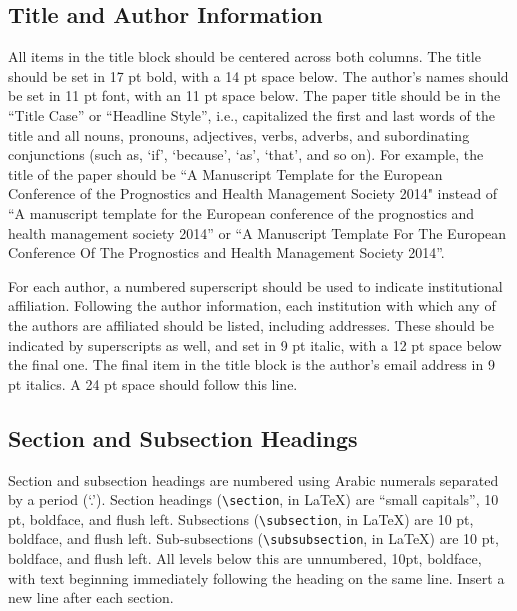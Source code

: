 \documentclass[IJPHM, 2014, 00]{PHMSociety}
\begin{document}
\subsection{Title and Author Information}
All items in the title block should be centered across both columns.  The title should be set in 17 pt bold, with a 14 pt space below.  The author's names should be set in 11 pt font, with an 11 pt space below. The paper title should be in the ``Title Case'' or ``Headline Style'', i.e., capitalized the first and last words of the title and all nouns, pronouns, adjectives, verbs, adverbs, and subordinating conjunctions (such as, `if', `because', `as', `that', and so on). For example, the title of the paper should be ``A Manuscript Template for the European Conference of the Prognostics and Health Management Society 2014" instead of ``A manuscript template for the European conference of the prognostics and health management society 2014'' or ``A Manuscript Template For The European Conference Of The Prognostics and Health Management Society 2014''.

For each author, a numbered superscript should be used to indicate institutional affiliation. Following the author information, each institution with which any of the authors are affiliated should be listed, including addresses. These should be indicated by superscripts as well, and set in 9 pt italic, with a 12 pt space below the final one. The final item in the title block is the author's email address in 9 pt italics.  A 24 pt space should follow this line.


\subsection{Section and Subsection Headings}

Section and subsection headings are numbered using Arabic numerals separated by a period (`.'). Section headings (\verb+\section+, in \LaTeX) are ``small capitals'', 10 pt, boldface, and flush left. Subsections (\verb+\subsection+, in \LaTeX) are 10 pt, boldface, and flush left.  Sub-subsections (\verb+\subsubsection+, in \LaTeX) are 10 pt, boldface, and flush left.  All levels below this are unnumbered, 10pt, boldface, with text beginning immediately following the heading on the same line. Insert a new line after each section.
\end{document}
